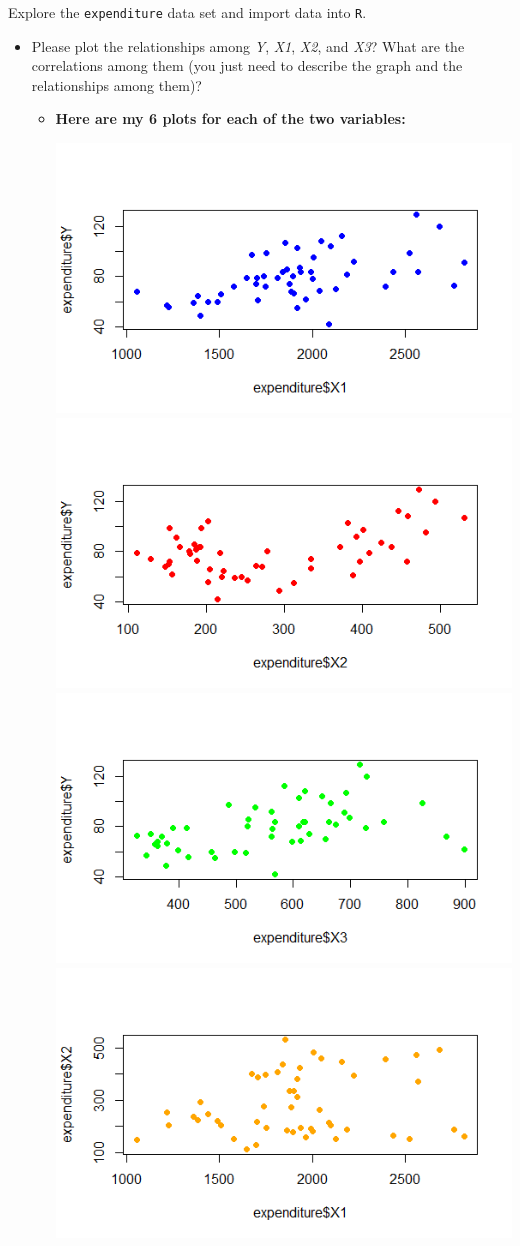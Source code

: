 \documentclass[12pt,letterpaper]{article}
\begin{document}
\vspace{.5cm}
\noindent Explore the \texttt{expenditure} data set and import data into \texttt{R}.
\vspace{.5cm}
  
\vspace{.5cm}
\begin{itemize}

\item
Please plot the relationships among \emph{Y}, \emph{X1}, \emph{X2}, and \emph{X3}? What are the correlations among them (you just need to describe the graph and the relationships among them)?
	\begin{itemize}
	\item \textbf{Here are my 6 plots for each of the two variables:}
	
	
		\includegraphics[width=.5\textwidth]{X1_y}\hfill
		\includegraphics[width=.5\textwidth]{X2_Y}\hfill
		\includegraphics[width=.5\textwidth]{X3_Y}\hfill
		\includegraphics[width=.5\textwidth]{X1_X2}\hfill

\end{itemize}
\end{itemize}
\end{document}
